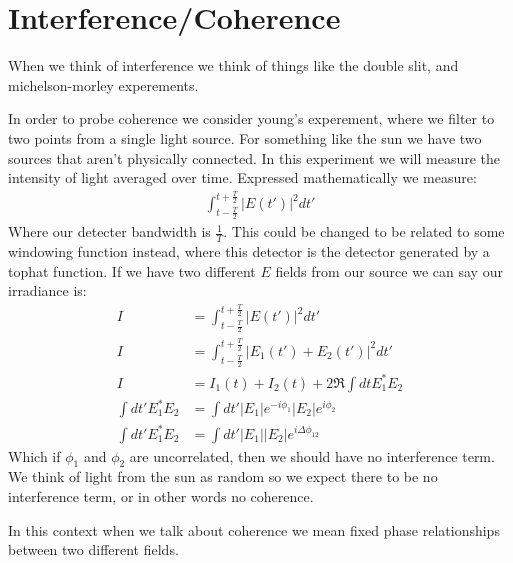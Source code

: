 \section{Interference/Coherence}
When we think of interference we think of things like the double slit, and michelson-morley experements.

In order to probe coherence we consider young's experement, where we filter to two points from a single light source. For something like the sun we have two sources that aren't physically connected.
In this experiment we will measure the intensity of light averaged over time. Expressed mathematically we measure:
\begin{align*}
	\int_{t-\frac{T}{2}}^{t+\frac{T}{2}} |E(t')|^2 dt'
\end{align*}
Where our detecter bandwidth is $\frac{1}{T}$. This could be changed to be related to some windowing function instead, where this detector is the detector generated by a tophat function.
If we have two different $E$ fields from our source we can say our irradiance is:
\begin{align*}
	I &= \int_{t-\frac{T}{2}}^{t+\frac{T}{2}} |E(t')|^2 dt' \\
	I &= \int_{t-\frac{T}{2}}^{t+\frac{T}{2}} |E_1(t') + E_2(t')|^2 dt' \\
	I &= I_1(t) + I_2(t) + 2\Re{\int dt E_1^* E_2} \\
	\int dt' E_1^* E_2 &= \int dt' |E_1| e^{-i\phi_1} |E_2| e^{i\phi_2} \\
	\int dt' E_1^* E_2 &= \int dt' |E_1| |E_2| e^{i\Delta \phi_{12}}
\end{align*}
Which if $\phi_1$ and $\phi_2$ are uncorrelated, then we should have no interference term. We think of light from the sun as random so we expect there to be no interference term, or in other words no coherence.

In this context when we talk about coherence we mean fixed phase relationships between two different fields.

